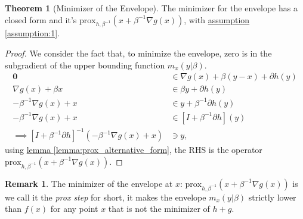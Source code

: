 \documentclass[]{article}
\theoremstyle{definition}
\newtheorem{theorem}{Theorem}       %
\newtheorem{remark}{Remark}[subsection]
{
    \newtheorem{assumption}{Assumption}
}
\begin{document}
        \begin{theorem}[Minimizer of the Envelope]\label{thm:minimizer_envelope}
            The minimizer for the envelope has a closed form and it's $\text{prox}_{h, \beta^{-1}}(x + \beta^{-1}\nabla g(x))$, with \hyperref[assumption:1]{assumption \ref*{assumption:1}}. 
        \end{theorem}
        \begin{proof}
            We consider the fact that, to minimize the envelope, zero is in the subgradient of the upper bounding function $m_x(y|\beta)$. 
            \begin{align*}
                \mathbf 0 &\in 
                \nabla g(x) + {\beta}(y - x) + \partial h(y)
                \\
                \nabla g(x) + \beta x & \in
                \beta y + \partial h(y)
                \\
                -\beta^{-1} \nabla g(x) + x &\in y + \beta^{-1} \partial h(y)
                \\
                -\beta^{-1} \nabla g(x) + x &\in [I + \beta^{-1} \partial h](y)
                \\
                \implies
                [I + \beta^{-1}\partial h]^{-1}(- \beta^{-1} \nabla g(x) + x) 
                & \ni y,
            \end{align*}
            using \hyperref[lemma:prox_alternative_form]{lemma \ref*{lemma:prox_alternative_form}}, the RHS is the operator $\text{prox}_{h, \beta^{-1}}(x + \beta^{-1}\nabla g(x))$. 
        \end{proof}
        \begin{remark}
            The minimizer of the envelope at $x$: $\text{prox}_{h, \beta^{-1}}(x + \beta^{-1}\nabla g(x))$ is we call it the \emph{prox step} for short, it makes the envelope $m_x(y|\beta)$ strictly lower than $f(x)$ for any point $x$ that is not the minimizer of $h + g$. 
        \end{remark}
\end{document}
